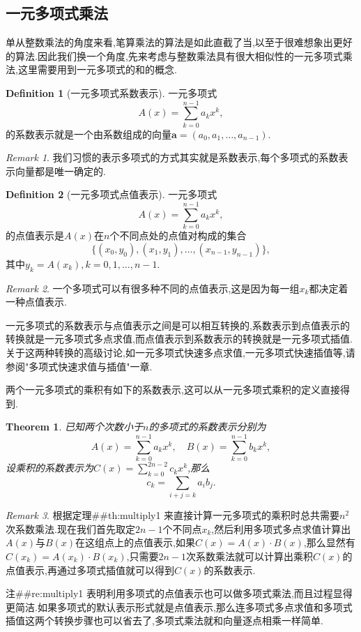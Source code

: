 \documentclass{ctexart}
\newtheorem{theorem}{Theorem}
\theoremstyle{remark}
\newtheorem{remark}{Remark}
\theoremstyle{definition}
\newtheorem{definition}{Definition}[section]
\begin{document}
\subsection{一元多项式乘法}

单从整数乘法的角度来看,笔算乘法的算法是如此直截了当,以至于很难想象出更好的算法.因此我们换一个角度,先来考虑与整数乘法具有很大相似性的一元多项式乘法,这里需要用到一元多项式的和的概念.

\begin{definition}[一元多项式系数表示]
一元多项式$$A(x)=\sum_{k=0}^{n-1}a_kx^k,$$的系数表示就是一个由系数组成的向量$\mathbf{a}=(a_0,a_1,\ldots,a_{n-1})$.
\end{definition}
\begin{remark}
我们习惯的表示多项式的方式其实就是系数表示,每个多项式的系数表示向量都是唯一确定的.
\end{remark}

\begin{definition}[一元多项式点值表示]
一元多项式$$A(x)=\sum_{k=0}^{n-1}a_kx^k,$$的点值表示是$A(x)$在$n$个不同点处的点值对构成的集合$$\{(x_0,y_0),(x_1,y_1),\ldots,(x_{n-1},y_{n-1})\},$$其中$y_k=A(x_k),k=0,1,\ldots,n-1$.
\end{definition}
\begin{remark}
一个多项式可以有很多种不同的点值表示,这是因为每一组$x_k$都决定着一种点值表示.
\end{remark}

一元多项式的系数表示与点值表示之间是可以相互转换的,系数表示到点值表示的转换就是一元多项式多点求值,而点值表示到系数表示的转换就是一元多项式插值.关于这两种转换的高级讨论,如一元多项式快速多点求值,一元多项式快速插值等,请参阅"多项式快速求值与插值"一章.

两个一元多项式的乘积有如下的系数表示,这可以从一元多项式乘积的定义直接得到.
\begin{theorem}\label{th:multiply1}
已知两个次数小于$n$的多项式的系数表示分别为$$A(x)=\sum_{k=0}^{n-1}a_kx^k,\quad B(x)=\sum_{k=0}^{n-1}b_kx^k,$$设乘积的系数表示为$C(x)=\sum\limits_{k=0}^{2n-2}c_kx^k$,那么$$c_k=\sum_{i+j=k}a_ib_j.$$
\end{theorem}
\begin{remark}\label{re:multiply1}
根据定理##th:multiply1
来直接计算一元多项式的乘积时总共需要$n^2$次系数乘法.现在我们首先取定$2n-1$个不同点$x_k$,然后利用多项式多点求值计算出$A(x)$与$B(x)$在这组点上的点值表示,如果$C(x)=A(x)\cdot B(x)$,那么显然有$C(x_k)=A(x_k)\cdot B(x_k)$,只需要$2n-1$次系数乘法就可以计算出乘积$C(x)$的点值表示,再通过多项式插值就可以得到$C(x)$的系数表示.
\end{remark}
注##re:multiply1
表明利用多项式的点值表示也可以做多项式乘法,而且过程显得更简洁.如果多项式的默认表示形式就是点值表示,那么连多项式多点求值和多项式插值这两个转换步骤也可以省去了,多项式乘法就和向量逐点相乘一样简单.
\end{document}
